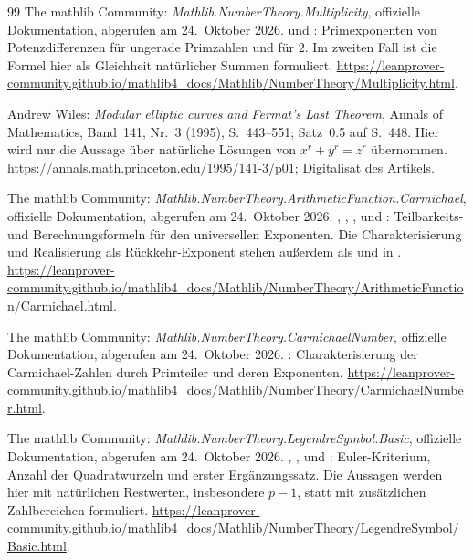 \begin{thebibliography}{99}
The mathlib Community: \emph{Mathlib.NumberTheory.Multiplicity},
offizielle Dokumentation, abgerufen am 24.~Oktober 2026.
 und :
Primexponenten von Potenzdifferenzen für ungerade Primzahlen und für $2$.
Im zweiten Fall ist die Formel hier als Gleichheit natürlicher Summen
formuliert.
\url{https://leanprover-community.github.io/mathlib4_docs/Mathlib/NumberTheory/Multiplicity.html}.

Andrew Wiles: \emph{Modular elliptic curves and Fermat's Last Theorem},
Annals of Mathematics, Band~141, Nr.~3 (1995), S.~443--551;
Satz~0.5 auf S.~448. Hier wird nur die Aussage über natürliche
Lösungen von $x^r+y^r=z^r$ übernommen.
\url{https://annals.math.princeton.edu/1995/141-3/p01};
\href{https://wstein.org/edu/Fall2003/252/references/wiles-flt/Wiles-Modular_Elliptic_Curves_and_Fermats_Last_Theorem.pdf}{Digitalisat des Artikels}.

The mathlib Community: \emph{Mathlib.NumberTheory.ArithmeticFunction.Carmichael},
offizielle Dokumentation, abgerufen am 24.~Oktober 2026.
,
,
,
 und
:
Teilbarkeits- und Berechnungsformeln für den universellen Exponenten.
Die Charakterisierung und Realisierung als Rückkehr-Exponent
stehen außerdem als  und
 in \cite{natprimroots}.
\url{https://leanprover-community.github.io/mathlib4_docs/Mathlib/NumberTheory/ArithmeticFunction/Carmichael.html}.

The mathlib Community: \emph{Mathlib.NumberTheory.CarmichaelNumber},
offizielle Dokumentation, abgerufen am 24.~Oktober 2026.
: Charakterisierung der
Carmichael-Zahlen durch Primteiler und deren Exponenten.
\url{https://leanprover-community.github.io/mathlib4_docs/Mathlib/NumberTheory/CarmichaelNumber.html}.

The mathlib Community: \emph{Mathlib.NumberTheory.LegendreSymbol.Basic},
offizielle Dokumentation, abgerufen am 24.~Oktober 2026.
, ,
 und :
Euler-Kriterium, Anzahl der Quadratwurzeln und erster Ergänzungssatz.
Die Aussagen werden hier mit natürlichen Restwerten, insbesondere
$p-1$, statt mit zusätzlichen Zahlbereichen formuliert.
\url{https://leanprover-community.github.io/mathlib4_docs/Mathlib/NumberTheory/LegendreSymbol/Basic.html}.


\end{thebibliography}
